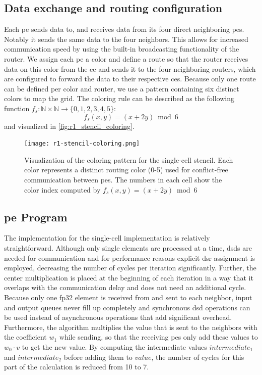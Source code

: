 \subsection{Data exchange and routing configuration}
Each \ac{pe} sends data to, and receives data from its four direct neighboring \acp{pe}. Notably it sends the same data to the four neighbors. This allows for increased communication speed by using the built-in broadcasting functionality of the router. We assign each \ac{pe} a color and define a route so that the router receives data on this color from the \ac{ce} and sends it to the four neighboring routers, which are configured to forward the data to their respective \acp{ce}. Because only one route can be defined per color and router, we use a pattern containing six distinct colors to map the grid.
The coloring rule can be described as the following function $f_s:\mathbb{N}\times\mathbb{N}\to\{0,1,2,3,4,5\}$:
\begin{equation}
    \label{eq:coloring_function}
    f_s(x,y) = (x + 2y) \bmod 6
\end{equation}
and visualized in \autoref{fig:r1_stencil_coloring}.
\begin{figure}
    \centering
    \texttt{[image: r1-stencil-coloring.png]}
    \caption{Visualization of the coloring pattern for the single-cell stencil. Each color represents a distinct routing color (0-5) used for conflict-free communication between \acp{pe}. The numbers in each cell show the color index computed by $f_s(x,y) = (x + 2y) \bmod 6$}
    \label{fig:r1_stencil_coloring}
\end{figure}

\subsection{\ac{pe} Program}
The implementation for the single-cell implementation is relatively straightforward.
Although only single elements are processed at a time, \acp{dsd} are needed for communication and for performance reasons explicit \ac{dsr} assignment is employed, decreasing the number of cycles per iteration significantly.  
Further, the center multiplication is placed at the beginning of each iteration in a way that it overlaps with the communication delay and does not need an additional cycle.
Because only one fp32 element is received from and sent to each neighbor, input and output queues never fill up completely and synchronous \ac{dsd} operations can be used instead of asynchronous operations that add significant overhead.
Furthermore, the algorithm multiplies the value that is sent to the neighbors with the coefficient $w_1$ while sending, so that the receiving \acp{pe} only add these values to $w_0 \cdot v$ to get the new value.
By computing the intermediate values $intermediate_1$ and $intermediate_2$ before adding them to $value$, the number of cycles for this part of the calculation is reduced from 10 to 7.

